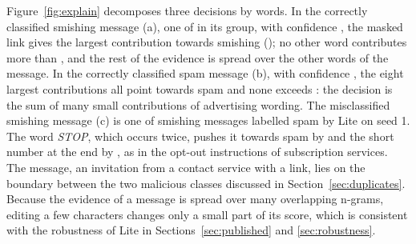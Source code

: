 Figure~\ref{fig:explain} decomposes three decisions by words. In the correctly classified smishing message (a), one of  in its group, with confidence , the masked link gives the largest contribution towards smishing (); no other word contributes more than , and the rest of the evidence is spread over the other words of the message. In the correctly classified spam message (b), with confidence , the eight largest contributions all point towards spam and none exceeds : the decision is the sum of many small contributions of advertising wording. The misclassified smishing message (c) is one of  smishing messages labelled spam by Lite on seed 1. The word \emph{STOP}, which occurs twice, pushes it towards spam by  and the short number at the end by , as in the opt-out instructions of subscription services. The message, an invitation from a contact service with a link, lies on the boundary between the two malicious classes discussed in Section~\ref{sec:duplicates}. Because the evidence of a message is spread over many overlapping n-grams, editing a few characters changes only a small part of its score, which is consistent with the robustness of Lite in Sections~\ref{sec:published} and \ref{sec:robustness}.
